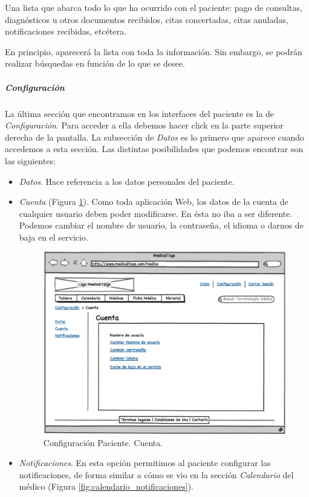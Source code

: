 		Una lista que abarca todo lo que ha ocurrido con el paciente: pago de consultas, diagnósticos u otros documentos recibidos, citas concertadas, citas anuladas, notificaciones recibidas, etcétera. 
		
		En principio, aparecerá la lista con toda la información. Sin embargo, se podrán realizar búsquedas en función de lo que se desee.		
		
		
		\subparagraph{Configuración} %
		\label{par:paciente_configuracion}
		
			La última sección que encontramos en los interfaces del paciente es la de \textit{Configuración}. Para acceder a ella debemos hacer click en la parte superior derecha de la pantalla. La subsección de \textit{Datos} es lo primero que aparece cuando accedemos a esta sección. Las distintas posibilidades que podemos encontrar son las siguientes:

			\begin{itemize}
				\item \textit{Datos}. Hace referencia a los datos personales del paciente. 
				\item \textit{Cuenta} (Figura \ref{fig:configuracion_cuenta_paciente}). Como toda aplicación Web, los datos de la cuenta de cualquier usuario deben poder modificarse. En ésta no iba a ser diferente. Podemos cambiar el nombre de usuario, la contraseña, el idioma o darnos de baja en el servicio.

				\begin{figure}[H]
				  \centering
				    \includegraphics[width=12cm]{img/eps/28_1_Cuenta_Pacientes.eps}
				  \caption{Configuración Paciente. Cuenta.}
				  \label{fig:configuracion_cuenta_paciente}
				\end{figure}

				\item \textit{Notificaciones}. En esta opción permitimos al paciente configurar las notificaciones, de forma similar a cómo se vio en la sección \textit{Calendario} del médico (Figura \ref{fig:calendario_notificaciones}). 
			\end{itemize}
		
